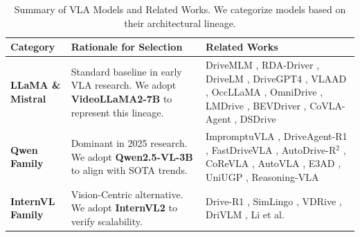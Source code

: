 \documentclass{article}
\begin{document}
\begin{table}[h]
    \centering
    \footnotesize 
    \renewcommand{\arraystretch}{1.3} %
    \setlength{\tabcolsep}{3pt} 
    
    \begin{tabularx}{\textwidth}{ 
        >{\raggedright\arraybackslash}p{2.2cm} 
        >{\raggedright\arraybackslash}p{4.5cm} 
        >{\raggedright\arraybackslash}X 
    }
    \toprule
    \textbf{Category} & \textbf{Rationale for Selection} & \textbf{Related Works} \\
    \midrule

    \textbf{LLaMA \& Mistral} 
    & Standard baseline in early VLA research. We adopt \textbf{VideoLLaMA2-7B} to represent this lineage.
    & DriveMLM \cite{e2e-vlm:drivemlm}, RDA-Driver \cite{e2e-vlm:rda-driver}, DriveLM \cite{e2e-vlm:drivelm}, DriveGPT4 \cite{e2e-vlm:drivegpt4}, VLAAD \cite{e2e-vlm:vlaad}, OccLLaMA \cite{e2e-vlm:occllama}, OmniDrive \cite{causal:e2e-vlm:omnidrive}, LMDrive \cite{e2e-vlm:lmdrive}, BEVDriver \cite{e2e-vlm:bevdriver}, CoVLA-Agent \cite{e2e-vlm:covla-agent}, DSDrive \cite{e2e-vlm:dsdrive} \\

    \midrule

    \textbf{Qwen Family} 
    & Dominant in 2025 research. We adopt \textbf{Qwen2.5-VL-3B} to align with SOTA trends.
    & ImpromptuVLA \cite{e2e-vlm:impromptuvla}, DriveAgent-R1 \cite{e2e-vlm:driveagent-r1}, FastDriveVLA \cite{e2e-vlm:fastdrivevla}, AutoDrive-R$^2$ \cite{e2e-vlm:autodrive-r2}, CoReVLA \cite{e2e-vlm:corevla}, AutoVLA \cite{e2e-vlm:autovla}, E3AD \cite{e2e-vlm:e3ad}, UniUGP \cite{e2e-vlm:uniugp}, Reasoning-VLA \cite{e2e-vlm:reasoning-vla} \\

    \midrule

    \textbf{InternVL Family} 
    & Vision-Centric alternative. We adopt \textbf{InternVL2} to verify scalability.
    & Drive-R1 \cite{e2e-vlm:drive-r1}, SimLingo \cite{causal:e2e-vlm:simlingo}, VDRive \cite{e2e-vlm:vdrive}, DriVLM \cite{e2e-vlm:drivlm}, Li et al. \cite{e2e-vlm:driving_with_internvl_challange} \\

    \bottomrule
    \end{tabularx}
    \caption{Summary of VLA Models and Related Works. We categorize models based on their architectural lineage.}
    \label{tab:backbone_summary}
\end{table}
\end{document}

